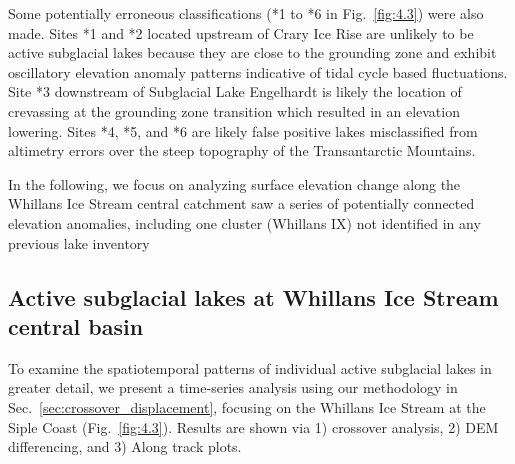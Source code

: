 Some potentially erroneous classifications (*1 to *6 in Fig.~\ref{fig:4.3}) were also made.
Sites *1 and *2 located upstream of Crary Ice Rise are unlikely to be active subglacial lakes because they are close to the grounding zone and exhibit oscillatory elevation anomaly patterns indicative of tidal cycle based fluctuations.
Site *3 downstream of Subglacial Lake Engelhardt is likely the location of crevassing at the grounding zone transition which resulted in an elevation lowering.
Sites *4, *5, and *6 are likely false positive lakes misclassified from altimetry errors over the steep topography of the Transantarctic Mountains.

In the following, we focus on analyzing surface elevation change along the Whillans Ice Stream central catchment saw a series of potentially connected elevation anomalies, including one cluster (Whillans IX) not identified in any previous lake inventory

\subsection{Active subglacial lakes at Whillans Ice Stream central basin} \label{sec:whillanscentralbasin}

To examine the spatiotemporal patterns of individual active subglacial lakes in greater detail, we present a time-series analysis using our methodology in Sec.~\ref{sec:crossover_displacement}, focusing on the Whillans Ice Stream at the Siple Coast (Fig.~\ref{fig:4.3}).
Results are shown via 1) crossover analysis, 2) \gls{DEM} differencing, and 3) Along track plots.



